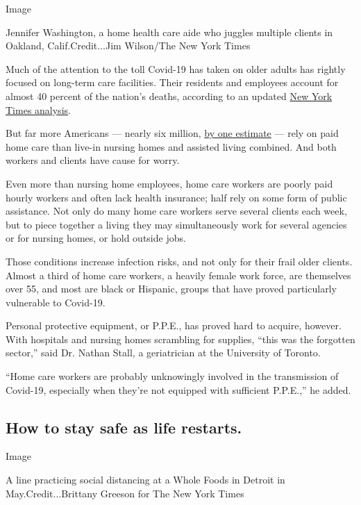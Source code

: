 Image

Jennifer Washington, a home health care aide who juggles multiple
clients in Oakland, Calif.Credit...Jim Wilson/The New York Times

Much of the attention to the toll Covid-19 has taken on older adults has
rightly focused on long-term care facilities. Their residents and
employees account for almost 40 percent of the nation's deaths,
according to an updated
\href{https://www.nytimes3xbfgragh.onion/interactive/2020/05/09/us/coronavirus-cases-nursing-homes-us.html}{New
York Times analysis}.

But far more Americans --- nearly six million,
\href{https://www.ncbi.nlm.nih.gov/pmc/articles/PMC5052697/}{by one
estimate} --- rely on paid home care than live-in nursing homes and
assisted living combined. And both workers and clients have cause for
worry.

Even more than nursing home employees, home care workers are poorly paid
hourly workers and often lack health insurance; half rely on some form
of public assistance. Not only do many home care workers serve several
clients each week, but to piece together a living they may
simultaneously work for several agencies or for nursing homes, or hold
outside jobs.

Those conditions increase infection risks, and not only for their frail
older clients. Almost a third of home care workers, a heavily female
work force, are themselves over 55, and most are black or Hispanic,
groups that have proved particularly vulnerable to Covid-19.

Personal protective equipment, or P.P.E., has proved hard to acquire,
however. With hospitals and nursing homes scrambling for supplies,
``this was the forgotten sector,'' said Dr. Nathan Stall, a geriatrician
at the University of Toronto.

``Home care workers are probably unknowingly involved in the
transmission of Covid-19, especially when they're not equipped with
sufficient P.P.E.,'' he added.

\hypertarget{how-to-stay-safe-as-life-restarts}{%
\subsection{How to stay safe as life
restarts.}\label{how-to-stay-safe-as-life-restarts}}

Image

A line practicing social distancing at a Whole Foods in Detroit in
May.Credit...Brittany Greeson for The New York Times

